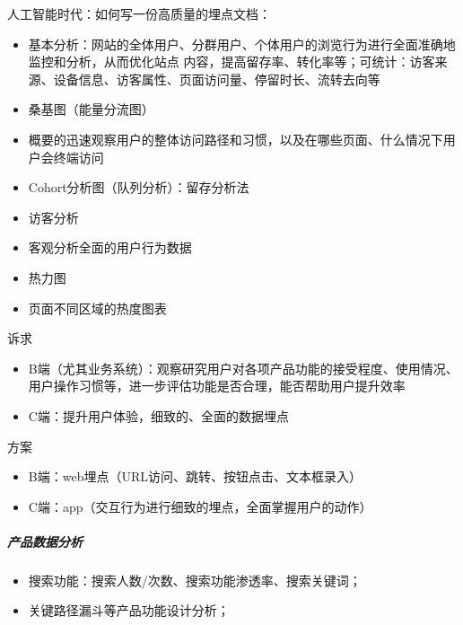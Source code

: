 \documentclass[letterpaper,11pt,english]{sphinxmanual}
\begin{document}
人工智能时代：如何写一份高质量的埋点文档：

\begin{itemize}
\item {} 
基本分析：网站的全体用户、分群用户、个体用户的浏览行为进行全面准确地监控和分析，从而优化站点
内容，提高留存率、转化率等；可统计：访客来源、设备信息、访客属性、页面访问量、停留时长、流转去向等

\item {} 
桑基图（能量分流图）

\item {} 
概要的迅速观察用户的整体访问路径和习惯，以及在哪些页面、什么情况下用户会终端访问

\item {} 
Cohort分析图（队列分析）：留存分析法

\item {} 
访客分析

\item {} 
客观分析全面的用户行为数据

\item {} 
热力图

\item {} 
页面不同区域的热度图表

\end{itemize}


诉求
\begin{itemize}
\item {} 
B端（尤其业务系统）：观察研究用户对各项产品功能的接受程度、使用情况、用户操作习惯等，进一步评估功能是否合理，能否帮助用户提升效率

\item {} 
C端：提升用户体验，细致的、全面的数据埋点

\end{itemize}

方案
\begin{itemize}
\item {} 
B端：web埋点（URL访问、跳转、按钮点击、文本框录入）

\item {} 
C端：app（交互行为进行细致的埋点，全面掌握用户的动作）

\end{itemize}


\subparagraph{产品数据分析}
\label{\detokenize{chapter_knowledge/data_analysis:id14}}\begin{itemize}
\item {} 
搜索功能：搜索人数/次数、搜索功能渗透率、搜索关键词；

\item {} 
关键路径漏斗等产品功能设计分析；

\end{itemize}
\end{document}
